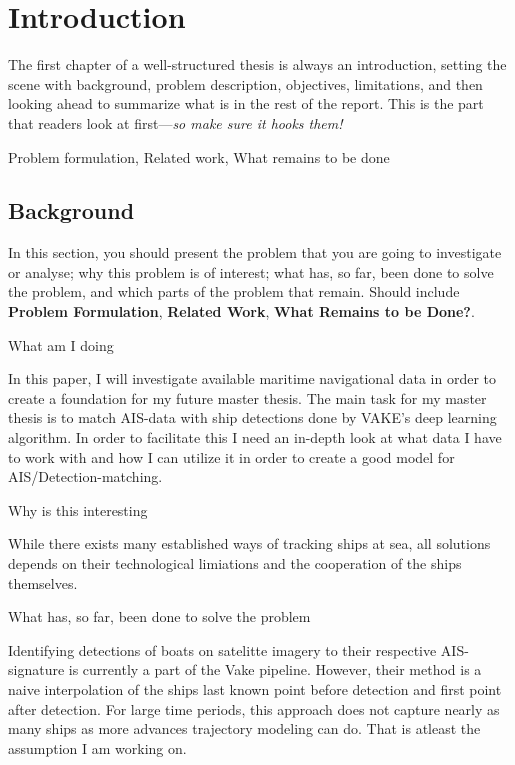 \chapter{Introduction}
\label{chp:introduction}
\begin{info}
	The first chapter of a well-structured thesis is always an introduction, setting the scene with background, problem description, objectives, limitations, and then looking ahead to summarize what is in the rest of the report. This is the part that readers look at first---\emph{so make sure it hooks them!}

	Problem formulation,
	Related work,
	What remains to be done
\end{info}



\section{Background}
\label{sec:background}
\begin{info}
	In this section, you should present the problem that you are going to investigate or analyse; why this problem is of interest; what has, so far, been done to solve the problem, and which parts of the problem that remain. Should include \textbf{Problem Formulation}, \textbf{Related Work}, \textbf{What Remains to be Done?}.
\end{info}
\begin{info}
	What am I doing
\end{info}
In this paper, I will investigate available maritime navigational data in order to create a foundation for my future master thesis. The main task for my master thesis is to match AIS-data with ship detections done by VAKE's deep learning algorithm. In order to facilitate this I need an in-depth look at what data I have to work with and how I can utilize it in order to create a good model for AIS/Detection-matching.

\begin{info}
	Why is this interesting
\end{info}

While there exists many established ways of tracking ships at sea, all solutions depends on their technological limiations and the cooperation of the ships themselves.

\begin{info}
	What has, so far, been done to solve the problem
\end{info}
Identifying detections of boats on satelitte imagery to their respective AIS-signature is currently a part of the Vake pipeline. However, their method is a naive interpolation of the ships last known point before detection and first point after detection. For large time periods, this approach does not capture nearly as many ships as more advances trajectory modeling can do. That is atleast the assumption I am working on.

